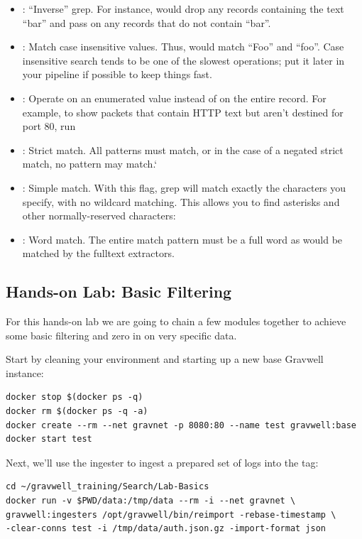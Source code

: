 \begin{itemize}
\item {}: ``Inverse'' grep. For instance,  would drop any records containing the text ``bar'' and pass on any records that do not contain ``bar''.
\item {}: Match case insensitive values. Thus,  would match ``Foo'' and ``foo''. Case insensitive search tends to be one of the slowest operations; put it later in your pipeline if possible to keep things fast.
\item {}: Operate on an enumerated value instead of on the entire record. For example, to show packets that contain HTTP text but aren’t destined for port 80, run 
\item {}: Strict match. All patterns must match, or in the case of a negated strict match, no pattern may match.`
\item {}: Simple match. With this flag, grep will match exactly the characters you specify, with no wildcard matching. This allows you to find asterisks and other normally-reserved characters: 
\item {}: Word match. The entire match pattern must be a full word as would be matched by the fulltext extractors.
\end{itemize}

\clearpage
\subsection{Hands-on Lab: Basic Filtering}
\label{sec:lab-filter}

For this hands-on lab we are going to chain a few modules together to
achieve some basic filtering and zero in on very specific data.

Start by cleaning your environment and starting up a new base Gravwell
instance:

\begin{Verbatim}[breaklines=true]
docker stop $(docker ps -q)
docker rm $(docker ps -q -a)
docker create --rm --net gravnet -p 8080:80 --name test gravwell:base
docker start test
\end{Verbatim}

Next, we'll use the  ingester to ingest a prepared set of logs into the  tag:

\begin{Verbatim}[breaklines=true]
cd ~/gravwell_training/Search/Lab-Basics
docker run -v $PWD/data:/tmp/data --rm -i --net gravnet \
gravwell:ingesters /opt/gravwell/bin/reimport -rebase-timestamp \
-clear-conns test -i /tmp/data/auth.json.gz -import-format json
\end{Verbatim}

